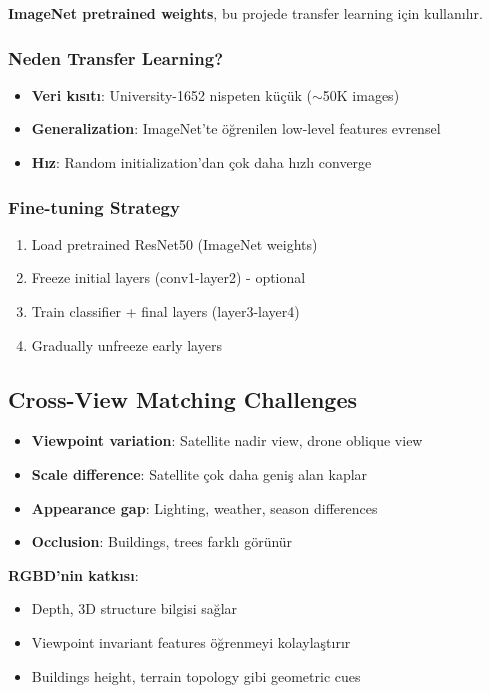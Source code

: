 \documentclass[12pt,a4paper]{article}
\begin{document}
\textbf{ImageNet pretrained weights}, bu projede transfer learning için kullanılır.

\subsubsection{Neden Transfer Learning?}
\begin{itemize}
    \item \textbf{Veri kısıtı}: University-1652 nispeten küçük ($\sim$50K images)
    \item \textbf{Generalization}: ImageNet'te öğrenilen low-level features evrensel
    \item \textbf{Hız}: Random initialization'dan çok daha hızlı converge
\end{itemize}

\subsubsection{Fine-tuning Strategy}
\begin{enumerate}
    \item Load pretrained ResNet50 (ImageNet weights)
    \item Freeze initial layers (conv1-layer2) - optional
    \item Train classifier + final layers (layer3-layer4)
    \item Gradually unfreeze early layers
\end{enumerate}

\subsection{Cross-View Matching Challenges}

\begin{itemize}
    \item \textbf{Viewpoint variation}: Satellite nadir view, drone oblique view
    \item \textbf{Scale difference}: Satellite çok daha geniş alan kaplar
    \item \textbf{Appearance gap}: Lighting, weather, season differences
    \item \textbf{Occlusion}: Buildings, trees farklı görünür
\end{itemize}

\textbf{RGBD'nin katkısı}:
\begin{itemize}
    \item Depth, 3D structure bilgisi sağlar
    \item Viewpoint invariant features öğrenmeyi kolaylaştırır
    \item Buildings height, terrain topology gibi geometric cues
\end{itemize}
\end{document}
